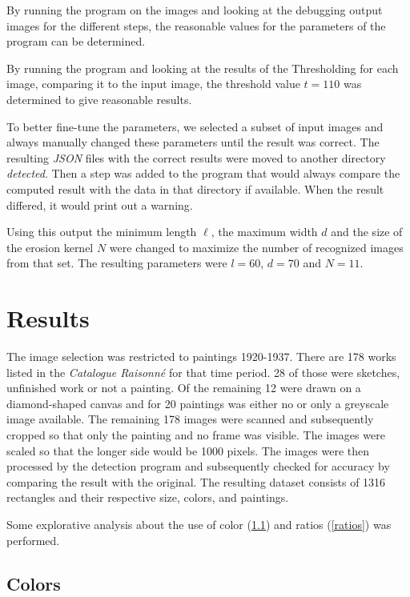 \documentclass[serif,article,noparskip]{agse-thesis}
\begin{document}
By running the program on the images and looking at the debugging output images
for the different steps, the reasonable values for the parameters of the program
can be determined.

By running the program and looking at the results of the Thresholding for each
image, comparing it to the input image, the threshold value $t = 110$ was
determined to give reasonable results.

To better fine-tune the parameters, we selected a subset of input images and
always manually changed these parameters until the result was correct. The
resulting \textit{JSON} files with the correct results were moved to another
directory \textit{detected}. Then a step was added to the program that would
always compare the computed result with the data in that directory if available.
When the result differed, it would print out a warning.

Using this output the minimum length $\ell$, the maximum width $d$ and the size of
the erosion kernel $N$ were changed to maximize the number of recognized images
from that set. The resulting parameters were $l = 60$, $d = 70$ and $N =11$.

\section{Results} \label{results}

 The image selection was restricted to paintings 1920-1937. There are 178 works
 listed in the \textit{Catalogue Raisonn{\'e}} \cite{joosten1998} for that time
 period. 28 of those were sketches, unfinished work or not a painting. Of the
 remaining 12 were drawn on a diamond-shaped canvas and for 20 paintings was
 either no or only a greyscale image available. The remaining 178 images were
 scanned and subsequently cropped so that only the painting and no frame was
 visible.  The images were scaled so that the longer side would be 1000
 pixels. The images were then processed by the detection program and subsequently
 checked for accuracy by comparing the result with the original. The resulting
 dataset consists of 1316 rectangles and their respective size, colors, and
 paintings.

Some explorative analysis about the use of color (\ref{color}) and ratios
(\ref{ratios}) was performed.

\subsection{Colors} \label{color}
\end{document}
